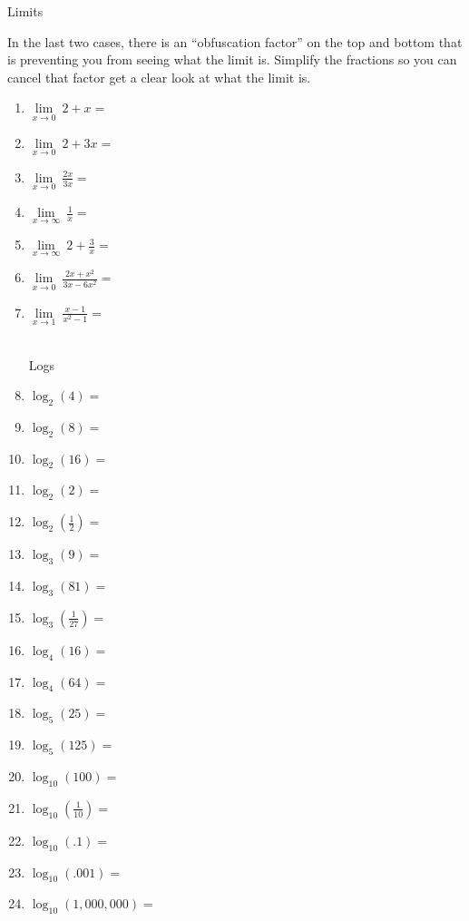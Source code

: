 \documentclass{article}
\begin{document}
\newtheorem*{theorem*}{Theorem}
	
	\centerline{\Large{ Limits}}\vspace{12 pt}
	In the last two cases, there is an ``obfuscation factor'' on the top and bottom that is preventing you from seeing what the limit is. Simplify the fractions so you can cancel that factor get a clear look at what the limit is. 
	\begin{enumerate} 
	\item $\underset{x \rightarrow 0}{\lim} \ 2+x=$
	\item $\underset{x \rightarrow 0}{\lim} \ 2+3x=$
	\item $\underset{x \rightarrow 0}{\lim} \ \frac{2x}{3x}=$
\item $\underset{x \rightarrow \infty}{\lim} \ \frac{1}{x}=$
	\item $\underset{x \rightarrow \infty}{\lim} \ 2 + \frac{3}{x}=$ 
	\item $\underset{x \rightarrow 0}{\lim} \ \frac{2x + x^2}{3x - 6x^2}=$
	\item $\underset{x \rightarrow 1}{\lim} \ \frac{x-1}{x^2-1}=$ 
	\\ \\
	\centerline{\Large{ Logs \ \ \ \ \ \ \ \ \ \ \ }}\vspace{12 pt}
	\item $\log_2(4) =$
	\item $\log_2(8) =$
	\item $\log_2(16) =$
	\item $\log_2(2) =$
	\item $\log_2(\frac{1}{2}) =$
	\item $\log_3(9) =$
	\item $\log_3(81) =$
	\item $\log_3(\frac{1}{27}) =$
	\item $\log_4(16) =$
	\item $\log_{4}(64) =$
	\item $\log_5(25) =$
	\item $\log_5(125) =$
	\item $\log_{10}(100) =$
	\item $\log_{10}(\frac{1}{10}) =$
	\item $\log_{10}(.1) =$
	\item $\log_{10}(.001) =$
	\item $\log_{10}(1,000,000) =$
	
	\end{enumerate}
	
	\vfill
\centerline{}
\end{document}

